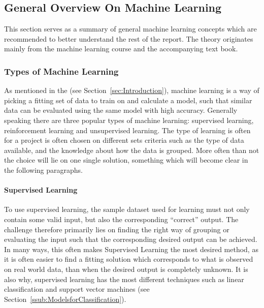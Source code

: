 \subsection{General Overview On Machine Learning}
\label{sub:GeneralML}
This section serves as a summary of general machine learning concepts
which are recommended to better understand the rest of the report.
The theory originates mainly from the machine learning course\cite{learningfromdata2012course} and the accompanying text book\cite{learningfromdata2012book}.

\subsubsection{Types of Machine Learning}
\label{ssub:TypesofMachineLearning}
As mentioned in the  (see Section~\ref{sec:Introduction}),
machine learning is a way of picking a fitting set of data to train on and calculate a model, 
such that similar data can be evaluated using the same model with high accuracy.
Generally speaking there are three popular types of machine learning:
supervised learning, reinforcement learning and unsupervised learning.
The type of learning is often for a project is often chosen on different sets criteria such as the type of data available,
and the knowledge about how the data is grouped.
More often than not the choice will lie on one single solution, something which will become clear in the following paragraphs.

\paragraph{Supervised Learning}
\label{par:SupervisedLearning}
To use supervised learning, the sample dataset used for learning must not only contain some valid input, but also the corresponding ``correct'' output.
The challenge therefore primarily lies on finding the right way of grouping or evaluating the input
such that the corresponding desired output can be achieved.
In many ways, this often makes Supervised Learning the most desired method, as it is often easier to find a fitting solution which corresponds to what is observed on real world data,
than when the desired output is completely unknown. It is also why, supervised learning has the most different techniques such as linear classification and support vector machines (see Section~\ref{ssub:ModelsforClassification}).

